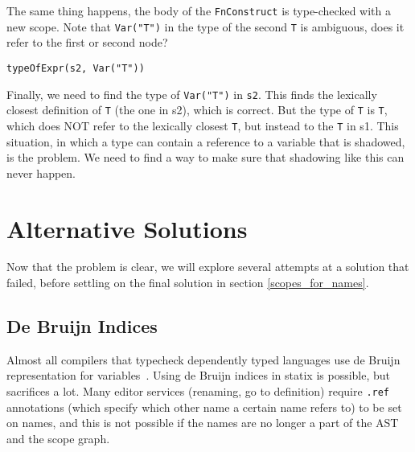 \noindent
The same thing happens, the body of the \verb|FnConstruct| is type-checked with a new scope. Note that \verb|Var("T")| in the type of the second \verb|T| is ambiguous, does it refer to the first or second node?

\begin{lstlisting}
typeOfExpr(s2, Var("T"))
\end{lstlisting}

Finally, we need to find the type of \verb|Var("T")| in \verb|s2|. This finds the lexically closest definition of \verb|T| (the one in s2), which is correct. But the type of \verb|T| is \verb|T|, which does NOT refer to the lexically closest \verb|T|, but instead to the \verb|T| in s1. This situation, in which a type can contain a reference to a variable that is shadowed, is the problem. We need to find a way to make sure that shadowing like this can never happen.

\section{Alternative Solutions}

Now that the problem is clear, we will explore several attempts at a solution that failed, before settling on the final solution in section \ref{scopes_for_names}.

\subsection{De Bruijn Indices}

Almost all compilers that typecheck dependently typed languages use de Bruijn representation for variables~\cite{lean}. Using de Bruijn indices in statix is possible, but sacrifices a lot. Many editor services (renaming, go to definition) require \verb|.ref| annotations (which specify which other name a certain name refers to) to be set on names, and this is not possible if the names are no longer a part of the AST and the scope graph.

